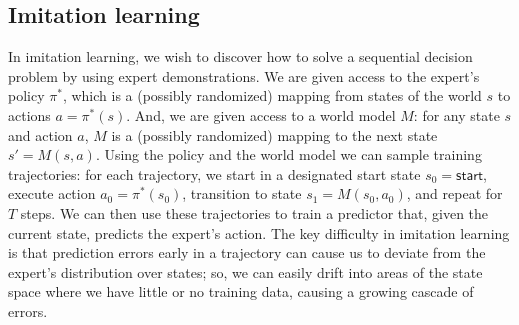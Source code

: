 \documentclass[twoside,11pt]{article}
\begin{document}

\subsection{Imitation learning}

In imitation learning, we wish to discover how to solve a sequential decision problem by using expert demonstrations.  We are given access to the expert's policy $\pi^*$, which is a (possibly randomized) mapping from states of the world $s$ to actions $a=\pi^*(s)$.  And, we are given access to a world model $M$: for any state $s$ and action $a$, $M$ is a (possibly randomized) mapping to the next state $s'=M(s,a)$.
Using the policy and the world model we can sample training trajectories: for each trajectory, we start in a designated start state $s_0=\textsf{start}$, execute action $a_0=\pi^*(s_0)$, transition to state $s_1=M(s_0,a_0)$, and repeat for $T$ steps.  We can then use these trajectories to train a predictor that, given the current state, predicts the expert's action.
The key difficulty in imitation learning is that prediction errors early in a trajectory can cause us to deviate from the expert's distribution over states; so, we can easily drift into areas of the state space where we have little or no training data, causing a growing cascade of errors.
\end{document}
